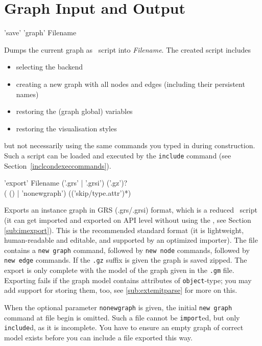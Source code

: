 \section{Graph Input and Output}
\label{outputcmds}

\begin{rail}
  'save' 'graph' Filename
\end{rail}
Dumps the current graph as \GrShell\ script into \emph{Filename}.
The created script includes
\begin{itemize}
  \item selecting the backend
  \item creating a new graph with all nodes and edges (including their persistent names)
  \item restoring the (graph global) variables
  \item restoring the visualisation styles
\end{itemize}
but not necessarily using the same commands you typed in during construction.
Such a script can be loaded and executed by the \texttt{include} command (see Section~\ref{inclcondexeccommands}).

\begin{rail}
  'export' Filename ('.grs' | '.grsi') ('.gz')? \\ ( () | 'nonewgraph') (('skip/type.attr')*)
\end{rail}
Exports an instance graph in GRS (.grs/.grsi) format, which is a reduced \GrShell\ script
(it can get imported and exported on API level without using the \GrShell, see Section \ref{sub:imexport}).
This is the recommended standard format (it is lightweight, human-readable and editable, and supported by an optimized importer).
The file contains a \texttt{new graph} command, followed by \texttt{new node} commands, followed by \texttt{new edge} commands.
If the \texttt{.gz} suffix is given the graph is saved zipped.
The export is only complete with the model of the graph given in the \texttt{.gm} file.
Exporting fails if the graph model contains attributes of \texttt{object}-type; you may add support for storing them, too, see \ref{sub:extemitparse} for more on this.

When the optional parameter \texttt{nonewgraph} is given, the initial \texttt{new graph} command at file begin is omitted.
Such a file cannot be \texttt{import}ed, but only \texttt{include}d, as it is incomplete.
You have to ensure an empty graph of correct model exists before you can include a file exported this way.

